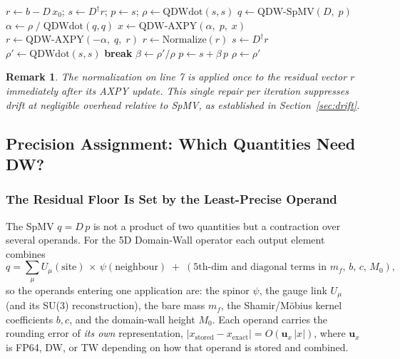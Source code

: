 \documentclass[12pt,a4paper]{article}
\newtheorem{remark}[theorem]{Remark}
\newcommand{\uu}{\mathbf{u}}
\begin{document}
\begin{algorithm}[H]
\caption{CGNE with QDW/QTW precision (Lattice QCD, DWF)}
\begin{algorithmic}[1]
\State $r \leftarrow b - D\,x_0$;\quad
       $s \leftarrow D^\dagger r$;\quad
       $p \leftarrow s$;\quad
       $\rho \leftarrow \mathrm{QDWdot}(s, s)$
  \State $q \leftarrow \mathrm{QDW\text{-}SpMV}(D,\; p)$
  \State $\alpha \leftarrow \rho \;/\; \mathrm{QDWdot}(q, q)$
  \State $x \leftarrow \mathrm{QDW\text{-}AXPY}(\alpha,\; p,\; x)$
  \State $r \leftarrow \mathrm{QDW\text{-}AXPY}(-\alpha,\; q,\; r)$
  \State $\boxed{r \leftarrow \mathrm{Normalize}(r)}$
  \State $s \leftarrow D^\dagger r$
  \State $\rho' \leftarrow \mathrm{QDWdot}(s, s)$
   \textbf{break} \EndIf
  \State $\beta \leftarrow \rho' / \rho$
  \State $p \leftarrow s + \beta\, p$
  \State $\rho \leftarrow \rho'$
\EndFor
\end{algorithmic}
\end{algorithm}

\begin{remark}
The normalization on line 7 is applied once to the residual vector $r$
immediately after its AXPY update.
This single repair per iteration suppresses drift at negligible overhead
relative to SpMV, as established in Section~\ref{sec:drift}.
\end{remark}

\subsection{Precision Assignment: Which Quantities Need DW?}
\label{sec:precision_assignment}

\subsubsection{The Residual Floor Is Set by the Least-Precise Operand}

The SpMV $q = D\,p$ is not a product of two quantities but a contraction over
several operands. For the 5D Domain-Wall operator each output element combines
\begin{equation}
  q = \sum_{\mu} U_\mu(\text{site})\,\times\,\psi(\text{neighbour})
      \;+\;(\text{5th-dim and diagonal terms in }m_f,\,b,\,c,\,M_0),
\end{equation}
so the operands entering one application are: the spinor $\psi$, the gauge link
$U_\mu$ (and its SU(3) reconstruction), the bare mass $m_f$, the
Shamir/M\"obius kernel coefficients $b,c$, and the domain-wall height $M_0$.
Each operand carries the rounding error of \emph{its own} representation,
$|x_{\mathrm{stored}} - x_{\mathrm{exact}}| = O(\uu_x\,|x|)$, where $\uu_x$ is
FP64, DW, or TW depending on how that operand is stored and combined.
\end{document}
